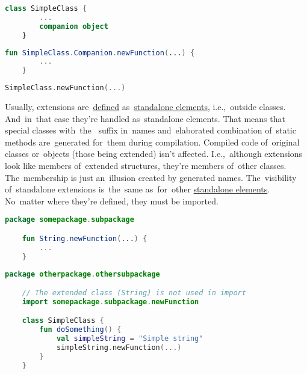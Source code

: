 \begin{lstlisting}[language=Kotlin, title={Class with a~companion object without a~body}]
    class SimpleClass {
        ...
        companion object
    }
\end{lstlisting}
\begin{lstlisting}[language=Kotlin, title={Companion object extension definition}]
    fun SimpleClass.Companion.newFunction(...) {
        ...
    }
\end{lstlisting}
\begin{lstlisting}[language=Kotlin, title={Usage}]
    SimpleClass.newFunction(...)
\end{lstlisting}

Usually, extensions are~\hyperref[declarationdefinition]{defined} as~\hyperref[kotlinstandalone]{standalone elements}, i.e.,~outside classes.
And~in~that case they're handled as~standalone elements.
That means that special classes \mbox{with the } suffix in~names and~elaborated combination of~static methods are~generated for~them during compilation.
Compiled code of~original classes or~objects (those being extended) isn't affected.
I.e.,~although extensions look like members of~extended structures, they're members of~other classes.
The~membership is just an~illusion created by generated names.
The~visibility of~standalone extensions is~the~same as~for~other \hyperref[kotlinstandalone]{standalone elements}.
No~matter where they're defined, they must be imported.

\begin{lstlisting}[language=Kotlin, title={Extension definition}]
    package somepackage.subpackage

    fun String.newFunction(...) {
        ...
    }
\end{lstlisting}
\begin{lstlisting}[language=Kotlin, title={Usage in a class}]
    package otherpackage.othersubpackage

    // The extended class (String) is not used in import
    import somepackage.subpackage.newFunction

    class SimpleClass {
        fun doSomething() {
            val simpleString = "Simple string"
            simpleString.newFunction(...)
        }
    }
\end{lstlisting}
\newline

